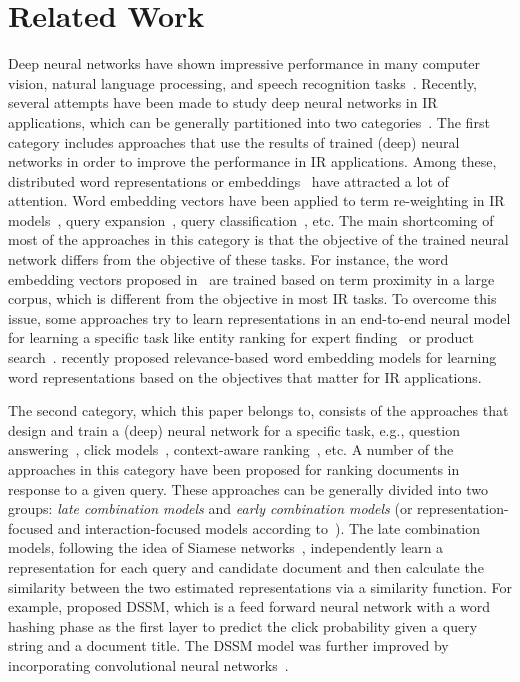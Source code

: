 \documentclass[sigconf]{acmart}
\begin{document}
\section{Related Work}
Deep neural networks have shown impressive performance in many computer vision, natural language processing, and speech recognition tasks~\citep{Lecun:2015}. 
Recently, several attempts have been made to study deep neural networks in IR applications, which can be generally partitioned into two categories~\citep{Onal:2016, Zhang:2016}. 
The first category includes approaches that use the results of trained (deep) neural networks in order to improve the performance in IR applications. Among these, distributed word representations or embeddings~\citep{Mikolov:2013,Pennington:2014} have attracted a lot of attention. Word embedding vectors have been applied to term re-weighting in IR models~\citep{Zheng:2015,Rekabsaz:2017}, query expansion~\citep{Diaz:2016,Zamani:2016a,Rekabsaz:2016}, query classification~\citep{Liu:2015,Zamani:2016b},  etc. 
The main shortcoming of most of the approaches in this category is that the objective of the trained neural network differs from the objective of these tasks.  For instance, the word embedding vectors proposed in~\citep{Mikolov:2013,Pennington:2014} are trained based on term proximity in a large corpus, which is different from the objective in most IR tasks. 
To overcome this issue, some approaches try to learn representations in an end-to-end neural model for learning a specific task like entity ranking for expert finding~\citep{VanGysel:2016:www} or product search~\citep{VanGysel:2016:cikm}. \citet{Zamani:2017} recently proposed relevance-based word embedding models for learning word representations based on the objectives that matter for IR applications.

The second category, which this paper belongs to, consists of the approaches that design and train a (deep) neural network for a specific task, e.g., question answering~\citep{Cohen:2016,Yang:2016}, click models~\citep{Borisov:2016}, context-aware ranking~\citep{Zamani:2017b}, etc.
A number of the approaches in this category have been proposed for ranking documents in response to a given query.
These approaches can be generally divided into two groups: \emph{late combination models} and \emph{early combination models} (or representation-focused and interaction-focused models according to~\citep{Guo:2016}). 
The late combination models, following the idea of Siamese networks~\citep{Bromley:1993}, independently learn a representation for each query and candidate document and then calculate the similarity between the two estimated representations via a similarity function. For example, \citet{Huang:2013} proposed DSSM, which is a feed forward neural network with a word hashing phase as the first layer to predict the click probability given a query string and a document title. 
The DSSM model was further improved by incorporating convolutional neural networks~\citep{Shen:2014}.
\end{document}

